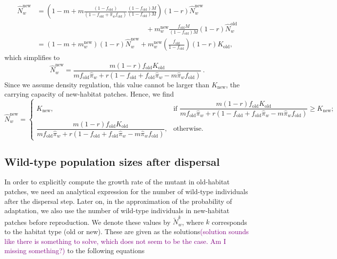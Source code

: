 \documentclass[11pt]{article}
\newcommand{\florence}[1]{\textcolor{purple}{(#1)}} %
\begin{document}
\begin{equation}\label{Seq:wt_deme2}
\begin{aligned}
\widehat{N}_w^{\text{new}} &= \left(1-m + m\frac{(1-f_{\text{old}})}{(1-f_{\text{old}}+\widehat{\pi}_w f_{\text{old}})} \frac{(1-f_{\text{old}})M}{(1-f_{\text{old}})M}\right)(1-r)\widehat{N}_w^{\text{new}} \\
&\qquad \qquad \qquad \qquad \qquad \qquad \qquad \qquad + m_w^{\text{new}} \frac{f_{\text{old}} M}{(1-f_{\text{old}})M} (1-r)  \widehat{N}_w^{\text{old}}\\
&= \left(1-m+m_w^{\text{new}} \right)(1-r)\widehat{N}_w^{\text{new}} + m_w^{\text{new}} \left(\frac{f_{\text{old}}}{1-f_{\text{old}}}\right) (1-r)  K_{\text{old}},
\end{aligned}
\end{equation}
%
which simplifies to
%
\begin{equation}
\widehat{N}_w^{\text{new}} = \frac{m (1-r) f_{\text{old}}  K_{\text{old}}}{m f_{\text{old}} \widehat{\pi}_w + r(1-f_{\text{old}}+f_{\text{old}}\widehat{\pi}_w -m \widehat{\pi}_w f_{\text{old}})}\ .
\end{equation}
%
Since we assume density regulation, this value cannot be larger than $K_{\text{new}}$, the carrying capacity of new-habitat patches. Hence, we find
\begin{equation}\label{Seq:Nhatnew}
\widehat{N}_w^{\text{new}} =\left\{ \begin{array}{ll} 
K_{\text{new}}, & \text{if }\dfrac{m (1-r) f_{\text{old}}  K_{\text{old}}}{m f_{\text{old}} \widehat{\pi}_w + r(1-f_{\text{old}}+f_{\text{old}}\widehat{\pi}_w -m \widehat{\pi}_w f_{\text{old}})}\geq K_{\text{new}}; \\
%
\dfrac{m (1-r) f_{\text{old}} K_{\text{old}}
}{m f_{\text{old}} \widehat{\pi}_w + r(1-f_{\text{old}}+f_{\text{old}}\widehat{\pi}_w -m \widehat{\pi}_w f_{\text{old}})}, & \text{otherwise}.
\end{array}\right.
\end{equation} 

\subsection*{Wild-type population sizes after dispersal}
In order to explicitly compute the growth rate of the mutant in old-habitat patches, we need an analytical expression for the number of wild-type individuals after the dispersal step. Later on, in the approximation of the probability of adaptation, we also use the number of wild-type individuals in new-habitat patches before reproduction. We denote these values by $\widetilde{N}_w^k$, where $k$ corresponds to the habitat type (old or new). These are given as the solutions\florence{solution sounds like there is something to solve, which does not seem to be the case. Am I missing something?} to the following equations
\end{document}
